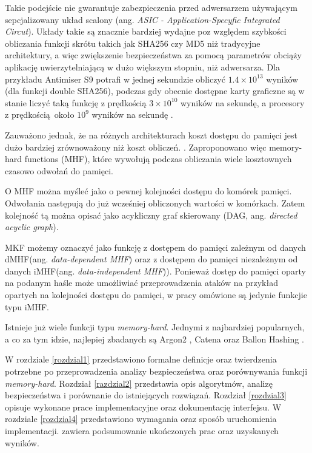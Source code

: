 Takie podejście nie gwarantuje zabezpieczenia przed adwersarzem używającym sepcjalizowany układ scalony (ang. \textit{ASIC - Application-Specyfic Integrated Circut}).
Układy takie są znacznie bardziej wydajne poz względem szybkości obliczania funkcji skrótu takich jak SHA256 czy MD5 niż tradycyjne architektury, a więc zwiększenie bezpieczeństwa za pomocą parametrów obciąży aplikację uwierzytelniającą w dużo większym stopniu, niż adwersarza.
Dla przykładu Antimiser S9 \cite{antminer} potrafi w jednej sekundzie obliczyć $1.4\times 10^{13}$ wyników (dla funkcji double SHA256), podczas gdy obecnie dostępne karty graficzne są w stanie liczyć taką funkcję z prędkością $3\times 10^{10}$ wyników na sekundę, a procesory z prędkością około $10^9$ wyników na sekundę \cite{rs}.

Zauważono jednak, że na różnych architekturach koszt dostępu do pamięci jest dużo bardziej zrównoważony niż koszt obliczeń. \cite{percival2009stronger}.
Zaproponowano więc memory-hard functions (MHF), które wywołują podczas obliczania wiele kosztownych czasowo odwołań do pamięci.

O MHF można myśleć jako o pewnej kolejności dostępu do komórek pamięci. Odwołania następują do już wcześniej obliczonych wartości w komórkach.
Zatem kolejność tą można opisać jako acykliczny graf skierowany (DAG, ang. \textit{directed acyclic graph}).

MKF możemy oznaczyć jako funkcję z dostępem do pamięci zależnym od danych dMHF(ang. \textit{data-dependent MHF}) oraz z dostępem do pamięci niezależnym od danych iMHF(ang. \textit{data-independent MHF})). Ponieważ dostęp do pamięci oparty na podanym haśle może umożliwiać przeprowadzenia ataków na przykład opartych na kolejności dostępu do pamięci, w pracy omówione są jedynie funkcjie typu iMHF.

Istnieje już wiele funkcji typu \textit{memory-hard}. Jednymi z najbardziej popularnych, a co za tym idzie, najlepiej zbadanych są Argon2 \cite{biryukov2016argon2}, Catena \cite{forler2013catena} oraz Ballon Hashing \cite{boneh2016balloon}.


W rozdziale \ref{rozdzial1} przedstawiono formalne definicje oraz twierdzenia potrzebne po przeprowadzenia analizy bezpieczeństwa oraz porównywania funkcji \textit{memory-hard}.
Rozdział \ref{razdzial2} przedstawia opis algorytmów, analizę bezpieczeństwa i porównanie do istniejących rozwiązań.
Rozdział \ref{rozdzial3} opisuje wykonane prace implementacyjne oraz dokumentację interfejsu.
W rozdziale \ref{rozdzial4} przedstawiono wymagania oraz sposób uruchomienia implementacji.
 zawiera podsumowanie ukończonych prac oraz uzyskanych wyników.

